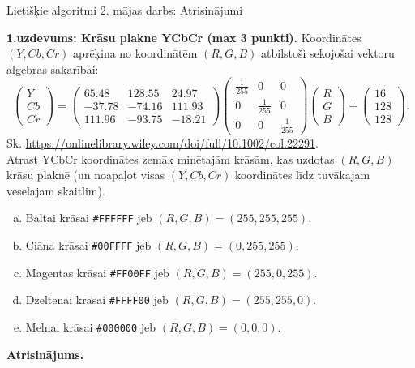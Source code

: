 \documentclass[11pt]{article}
\begin{document}
\thispagestyle{empty}

{\Large Lietišķie algoritmi \textendash{} 2. mājas darbs: Atrisinājumi}


{\footnotesize
{\bf 1.uzdevums: Krāsu plakne YCbCr (max 3 punkti).}
Koordinātes $(Y,Cb,Cr)$ aprēķina no koordinātēm $(R,G,B)$ atbilstoši 
sekojošai vektoru algebras sakarībai:
$$\left( \begin{array}{c}
Y\\
Cb\\
Cr
\end{array} \right) = \left( \begin{array}{ccc}
65.48 & 128.55 & 24.97\\
-37.78 & -74.16 & 111.93\\
111.96 & -93.75 & -18.21
\end{array} \right) \left( \begin{array}{ccc}
\frac{1}{255} & 0 & 0\\
0 & \frac{1}{255} & 0\\
0 & 0 & \frac{1}{255}
\end{array} \right) 
\left( \begin{array}{c}
R\\
G\\
B
\end{array} \right) + \left( \begin{array}{c}
16\\
128\\
128
\end{array} \right).$$
Sk. \url{https://onlinelibrary.wiley.com/doi/full/10.1002/col.22291}.\\
Atrast YCbCr koordinātes zemāk minētajām krāsām, kas uzdotas $(R,G,B)$ krāsu plaknē
(un noapaļot visas $(Y,Cb,Cr)$ koordinātes līdz tuvākajam veselajam skaitlim). 
\begin{enumerate}[(a)]
\item Baltai krāsai {\tt \#FFFFFF} jeb $(R,G,B) = (255,255,255)$. 
\item Ciāna krāsai  {\tt \#00FFFF} jeb $(R,G,B) = (0,255,255)$.
\item Magentas krāsai {\tt \#FF00FF} jeb $(R,G,B) = (255,0,255)$. 
\item Dzeltenai krāsai {\tt \#FFFF00} jeb $(R,G,B) = (255,255,0)$. 
\item Melnai krāsai  {\tt \#000000} jeb $(R,G,B) = (0,0,0)$.
\end{enumerate}
}

\vspace{6pt}
{\bf Atrisinājums.} 
\end{document}
